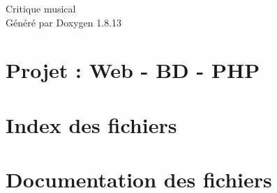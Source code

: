 \documentclass[twoside]{book}
\newcommand{\+}{\discretionary{\mbox{\scriptsize$\hookleftarrow$}}{}{}}
\newcommand{\clearemptydoublepage}{%
  \newpage{\pagestyle{empty}\cleardoublepage}%
}
\begin{document}
\hypersetup{pageanchor=false,
             bookmarksnumbered=true,
             pdfencoding=unicode
            }
\begin{titlepage}
\vspace*{7cm}
\begin{center}%
{\Large Critique musical }\\
\vspace*{1cm}
{\large Généré par Doxygen 1.8.13}\\
\end{center}
\end{titlepage}
\clearemptydoublepage
{}
\tableofcontents
\clearemptydoublepage
{}
\hypersetup{pageanchor=true}

\chapter{Projet \+: Web -\/ BD -\/ P\+HP}
\label{md_README}

\chapter{Index des fichiers}

\chapter{Documentation des fichiers}




























































\backmatter
\newpage
{}
\clearemptydoublepage
{}
\printindex
\end{document}

